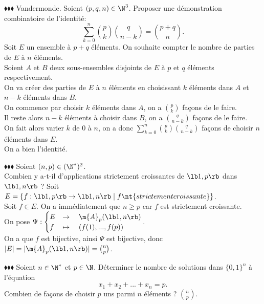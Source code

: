 \documentclass[11pt]{article}
\begin{document}
\begin{exercice}{$\blacklozenge\blacklozenge\blacklozenge$ Vandermonde.}{}
    Soient $(p,q,n)\in\N^3$. Proposer une démonstration combinatoire de l'identité:
    \begin{equation*}
        \sum_{k=0}^n\binom{p}{k}\binom{q}{n-k}=\binom{p+q}{n}.
    \end{equation*}
    \tcblower
    Soit $E$ un ensemble à $p+q$ éléments. On souhaite compter le nombre de parties de $E$ à $n$ éléments.\\
    Soient $A$ et $B$ deux sous-ensembles disjoints de $E$ à $p$ et $q$ éléments respectivement.\\
    On va créer des parties de $E$ à $n$ éléments en choisissant $k$ éléments dans $A$ et $n-k$ éléments dans $B$.\\
    On commence par choisir $k$ éléments dans $A$, on a $\binom{p}{k}$ façons de le faire.\\
    Il reste alors $n-k$ éléments à choisir dans $B$, on a $\binom{q}{n-k}$ façons de le faire.\\
    On fait alors varier $k$ de 0 à $n$, on a donc $\sum_{k=0}^n\binom{p}{k}\binom{q}{n-k}$ façons de choisir $n$ éléments dans $E$.\\
    On a bien l'identité.
\end{exercice}

\begin{exercice}{$\blacklozenge\blacklozenge\blacklozenge$}{}
    Soient $(n,p)\in(\N^*)^2$.\\
    Combien y a-t-il d'applications strictement croissantes de $\lb1,p\rb$ dans $\lb1,n\rb$ ?
    \tcblower
    Soit $E=\{f:\lb1,p\rb\to\lb1,n\rb\mid f \nt{ strictement croissante}\}$.\\
    Soit $f\in E$. On a immédiatement que $n\geq p$ car $f$ est strictement croissante.\\
    On pose $\Psi:\begin{cases}
        E&\to\quad\m{A}_p(\lb1,n\rb)\\
        f&\mapsto\quad(f(1),...,f(p))
    \end{cases}$.\\
    On a que $f$ est bijective, ainsi $\Psi$ est bijective, donc $|E|=|\m{A}_p(\lb1,n\rb)|=\binom{n}{p}$.
\end{exercice}

\begin{exercice}{$\blacklozenge\blacklozenge\blacklozenge$}{}
    Soient $n\in\N^*$ et $p\in\N$. Déterminer le nombre de solutions dans $\{0,1\}^n$ à l'équation
    \begin{equation*}
        x_1+x_2+...+x_n=p.
    \end{equation*}
    \tcblower
    Combien de façons de choisir $p$ uns parmi $n$ éléments ? $\binom{n}{p}$.
\end{exercice}
\end{document}
